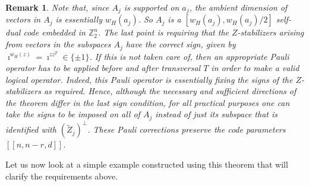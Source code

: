 \documentclass[twoside,romanappendices]{IEEEtran}
\newtheorem{remark}[theorem]{Remark}
\newcommand{\llbr}{[\![}
\newcommand{\rrbr}{]\!]}
\begin{document}
\begin{remark}
\label{rem:transversal_T_Pauli_correction}
\normalfont
Note that, since $A_j$ is supported on $a_j$, the ambient dimension of vectors in $A_j$ is essentially $w_H(a_j)$.
So $A_j$ is a $[w_H(a_j), w_H(a_j)/2]$ self-dual code embedded in $\mathbb{Z}_2^n$.
The last point is requiring that the $Z$-stabilizers arising from vectors in the subspaces $A_j$ have the correct sign, given by $\imath^{w_H(z)} = \imath^{zz^T} \in \{ \pm 1 \}$.
If this is not taken care of, then an appropriate Pauli operator has to be applied before and after transversal $T$ in order to make a valid logical operator.
Indeed, this Pauli operator is essentially fixing the signs of the $Z$-stabilizers as required.
Hence, although the necessary and sufficient directions of the theorem differ in the last sign condition, for all practical purposes one can take the signs to be imposed on all of $A_j$ instead of just its subspace that is identified with $(\tilde{Z}_j)^{\perp}$.
These Pauli corrections preserve the code parameters $\llbr n,n-r,d \rrbr$.
\end{remark}


Let us now look at a simple example constructed using this theorem that will clarify the requirements above.
\end{document}
